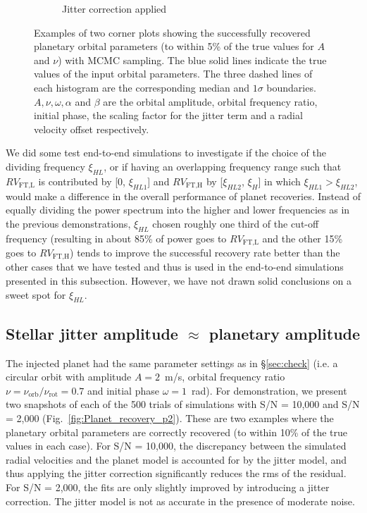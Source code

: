 \begin{figure}[tbp]
\begin{subfigure}[b]{0.49\textwidth}
        \caption{Jitter correction applied}
    \end{subfigure}	
    \caption[Corner plots of MCMC]
    {Examples of two corner plots showing the successfully recovered planetary orbital parameters (to within 5\% of the true values for $A$ and $\nu$) with MCMC sampling. The blue solid lines indicate the true values of the input orbital parameters. The three dashed lines of each histogram are the corresponding median and $1\sigma$ boundaries. $A, \nu, \omega, \alpha$ and $\beta$ are the orbital amplitude, orbital frequency ratio, initial phase, the scaling factor for the jitter term and a radial velocity offset respectively.}
\label{fig:Corner}
\end{figure}    

We did some test end-to-end simulations to investigate if the choice of the dividing frequency $\xi_{HL}$, or if having an overlapping frequency range such that $RV_\text{FT,L}$ is contributed by [0, $\xi_{HL1}$] and $RV_\text{FT,H}$ by [$\xi_{HL2}$, $\xi_H$] in which $\xi_{HL1} > \xi_{HL2}$, would make a difference in the overall performance of planet recoveries. Instead of equally dividing the power spectrum into the higher and lower frequencies as in the previous demonstrations, $\xi_{HL}$ chosen roughly one third of the cut-off frequency (resulting in about 85\% of power goes to $RV_\text{FT,L}$ and the other 15\% goes to $RV_\text{FT,H}$) tends to improve the successful recovery rate better than the other cases that we have tested and thus is used in the end-to-end simulations presented in this subsection. However, we have not drawn solid conclusions on a sweet spot for $\xi_{HL}$. 

\subsection{Stellar jitter amplitude $\approx$ planetary amplitude}

The injected planet had the same parameter settings as in \S\ref{sec:check} (i.e. a circular orbit with amplitude $A = 2$~m/s, orbital frequency ratio $\nu = \nu_\text{orb}/\nu_\text{rot}= 0.7$ and initial phase $\omega = 1$~rad). For demonstration, we present two snapshots of each of the 500 trials of simulations with S/N = 10,000 and S/N = 2,000 (Fig.~\ref{fig:Planet_recovery_p2}). These are two examples where the planetary orbital parameters are correctly recovered (to within 10\% of the true values in each case). For S/N = 10,000, the discrepancy between the simulated radial velocities and the planet model is accounted for by the jitter model, and thus applying the jitter correction significantly reduces the rms of the residual. For S/N = 2,000, the fits are only slightly improved by introducing a jitter correction. The jitter model is not as accurate in the presence of moderate noise. 

